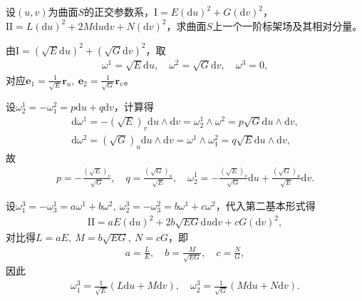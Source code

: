 \documentclass[../../main.tex]{subfiles}%
\begin{document}
\begin{example}
设$(u,v)$为曲面$S$的正交参数系，$\mathrm{I}=E(\mathrm{d}u)^2+G(\mathrm{d}v)^2$，$\mathrm{II}=L(\mathrm{d}u)^2+2M\mathrm{d}u\mathrm{d}v+N(\mathrm{d}v)^2$，求曲面$S$上一个一阶标架场及其相对分量。
\end{example}

\begin{solution}

由$\mathrm{I}=(\sqrt{E}\mathrm{d}u)^2+(\sqrt{G}\mathrm{d}v)^2$，取
\begin{align*}
\omega^1=\sqrt{E}\mathrm{d}u,\quad \omega^2=\sqrt{G}\mathrm{d}v,\quad \omega^3=0,
\end{align*}
对应$\boldsymbol{e}_1=\frac{1}{\sqrt{E}}\boldsymbol{r}_u,\ \boldsymbol{e}_2=\frac{1}{\sqrt{G}}\boldsymbol{r}_v$。

设$\omega_2^1=-\omega_1^2=p\mathrm{d}u+q\mathrm{d}v$，计算得
\begin{align*}
\mathrm{d}\omega^1=-(\sqrt{E})_v\mathrm{d}u\wedge\mathrm{d}v=\omega_2^1\wedge\omega^2=p\sqrt{G}\mathrm{d}u\wedge\mathrm{d}v,\\
\mathrm{d}\omega^2=(\sqrt{G})_u\mathrm{d}u\wedge\mathrm{d}v=\omega^1\wedge\omega_1^2=q\sqrt{E}\mathrm{d}u\wedge\mathrm{d}v,
\end{align*}
故
\begin{align*}
p=-\frac{(\sqrt{E})_v}{\sqrt{G}},\quad q=\frac{(\sqrt{G})_u}{\sqrt{E}},\quad \omega_2^1=-\frac{(\sqrt{E})_v}{\sqrt{G}}\mathrm{d}u+\frac{(\sqrt{G})_u}{\sqrt{E}}\mathrm{d}v.
\end{align*}

设$\omega_1^3=-\omega_3^1=a\omega^1+b\omega^2,\ \omega_2^3=-\omega_3^2=b\omega^1+c\omega^2$，代入第二基本形式得
\begin{align*}
\mathrm{II}=aE(\mathrm{d}u)^2+2b\sqrt{EG}\mathrm{d}u\mathrm{d}v+cG(\mathrm{d}v)^2,
\end{align*}
对比得$L=aE,\ M=b\sqrt{EG},\ N=cG$，即
\begin{align*}
a=\frac{L}{E},\quad b=\frac{M}{\sqrt{EG}},\quad c=\frac{N}{G},
\end{align*}
因此
\begin{align*}
\omega_1^3=\frac{1}{\sqrt{E}}(L\mathrm{d}u+M\mathrm{d}v),\quad \omega_2^3=\frac{1}{\sqrt{G}}(M\mathrm{d}u+N\mathrm{d}v).
\end{align*}

\end{solution}
\end{document}
